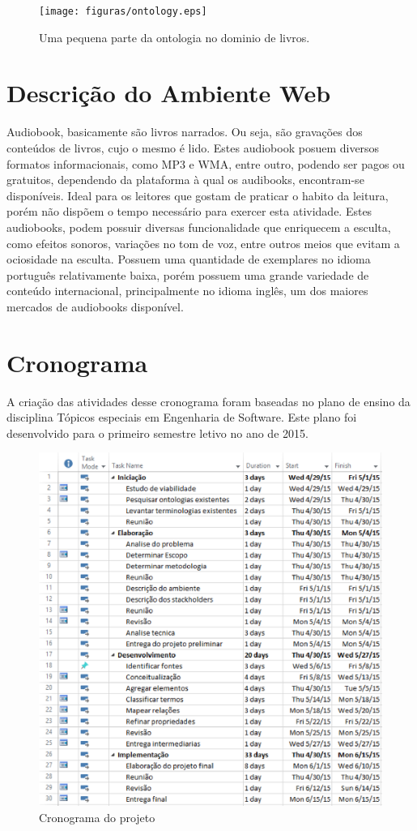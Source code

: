  \begin{figure}[ht]
	\centering
		\texttt{[image: figuras/ontology.eps]}
	\caption{Uma pequena parte da ontologia no dominio de livros.}
	\label{lanctocalivros}
\end{figure}

\section{Descrição do Ambiente Web}
Audiobook, basicamente são livros narrados. Ou seja, são gravações dos conteúdos de livros, cujo o mesmo é lido. Estes audiobook posuem diversos formatos informacionais, como MP3 e WMA, entre outro, podendo ser pagos ou gratuitos, dependendo da plataforma à qual os audibooks, encontram-se disponíveis.
Ideal para os leitores que gostam de praticar o habito da leitura, porém não dispõem o tempo necessário para exercer esta atividade. Estes audiobooks, podem possuir diversas funcionalidade que enriquecem a esculta, como efeitos sonoros, variações no tom de voz, entre outros meios que evitam a ociosidade na esculta.
Possuem uma quantidade de exemplares no idioma português relativamente baixa, porém possuem uma grande variedade de conteúdo internacional, principalmente no idioma inglês, um dos maiores mercados de audiobooks disponível.

\section{Cronograma}
A criação das atividades desse cronograma foram baseadas no plano de ensino da disciplina Tópicos especiais em Engenharia de Software. Este plano foi desenvolvido para o primeiro semestre letivo no ano de 2015.

 \begin{figure}[ht]
  \centering
    \includegraphics[keepaspectratio=true,scale=0.5]{figuras/cronograma.eps}
  \caption{Cronograma do projeto}
\end{figure}